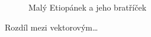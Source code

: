 \documentclass[11pt,a4paper]{article}
\begin{document}
\begin{figure}[h!]
\begin{center}
		\caption{Malý Etiopánek a jeho bratříček} 
		\label{fig:etiopan}	
	\end{center}
\end{figure}

Rozdíl mezi vektorovým\ldots
\end{document}
